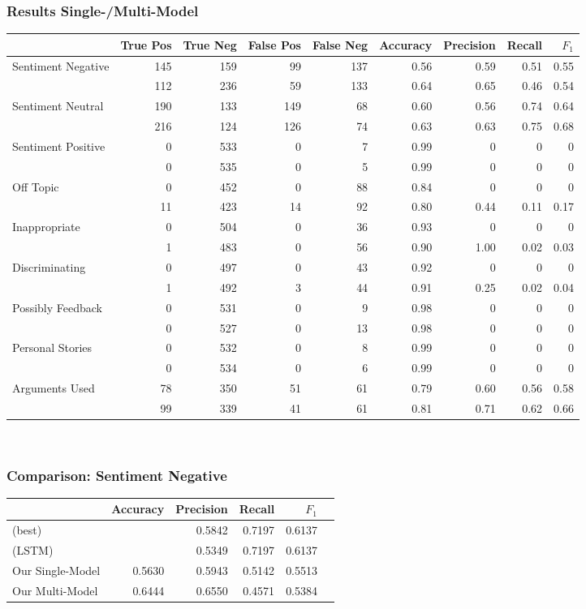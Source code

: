 \documentclass[compress,aspectratio=169]{beamer} %
\begin{document}
\begin{frame}[fragile]
	\frametitle{Results Single-/Multi-Model}
	\centering\scriptsize
	\begin{tabular}{l r r r r r r r r}
		& True Pos & True Neg & False Pos & False Neg & Accuracy & Precision & Recall & $F_1$ \\
		\hline
		Sentiment Negative & 145 & 159 & 99 & 137 & 0.56 & 0.59 & 0.51 & 0.55 \\
		& 112 & 236 & 59 & 133 & 0.64 & 0.65 & 0.46 & 0.54 \\
		\hline
		Sentiment Neutral & 190 & 133 & 149 & 68 & 0.60 & 0.56 & 0.74 & 0.64 \\
		& 216 & 124 & 126 & 74 & 0.63 & 0.63 & 0.75 & 0.68 \\
		\hline
		Sentiment Positive & 0 & 533 & 0 & 7 & 0.99 & 0 & 0 & 0 \\
		& 0 & 535 & 0 & 5 & 0.99 & 0 & 0 & 0 \\
		\hline
		Off Topic & 0 & 452 & 0 & 88 & 0.84 & 0 & 0 & 0 \\
		& 11 & 423 & 14 & 92 & 0.80 & 0.44 & 0.11 & 0.17 \\
		\hline
		Inappropriate & 0 & 504 & 0 & 36 & 0.93 & 0 & 0 & 0 \\
		& 1 & 483 & 0 & 56 & 0.90 & 1.00 & 0.02 & 0.03 \\
		\hline
		Discriminating & 0 & 497 & 0 & 43 & 0.92 & 0 & 0 & 0 \\
		& 1 & 492 & 3 & 44 & 0.91 & 0.25 & 0.02 & 0.04 \\
		\hline
		Possibly Feedback & 0 & 531 & 0 & 9 & 0.98 & 0 & 0 & 0 \\
		& 0 & 527 & 0 & 13 & 0.98 & 0 & 0 & 0 \\
		\hline
		Personal Stories & 0 & 532 & 0 & 8 & 0.99 & 0 & 0 & 0 \\
		& 0 & 534 & 0 & 6 & 0.99 & 0 & 0 & 0 \\
		\hline
		Arguments Used & 78 & 350 & 51 & 61 & 0.79 & 0.60 & 0.56 & 0.58\\
		& 99 & 339 & 41 & 61 & 0.81 & 0.71 & 0.62 & 0.66 \\
	\end{tabular}\\
\end{frame}

\begin{frame}[fragile]
	\frametitle{Comparison: Sentiment Negative}
	\centering
	\begin{tabular}{l r r r r r}
		& Accuracy & Precision & Recall & $F_1$ \\
		\hline
		\cite{Schabus17} (best) & & 0.5842 & 0.7197 & 0.6137 \\
		\cite{Schabus17} (LSTM) & & 0.5349 & 0.7197 & 0.6137 \\
		\hline
		Our Single-Model & 0.5630 & 0.5943 & 0.5142 & 0.5513\\
		Our Multi-Model & 0.6444 & 0.6550 & 0.4571 & 0.5384 \\
	\end{tabular}\\
\end{frame}
\end{document}
